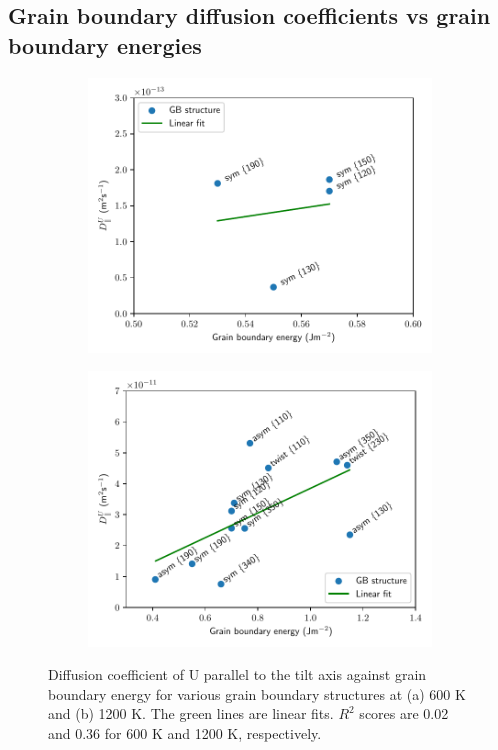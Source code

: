 \documentclass{elsarticle}
\begin{document}
\begin{appendices}
\section{Grain boundary diffusion coefficients vs grain boundary energies}

\begin{figure}[!ht]
    \centering
    \begin{subfigure}{0.49\textwidth}
        \centering
        \caption{}
        \includegraphics[width=\textwidth]{DvsGBE_600K.pdf}
    \end{subfigure}
    \begin{subfigure}{0.49\textwidth}
        \centering
        \caption{}
        \includegraphics[width=\textwidth]{DvsGBE_1200K.pdf}
    \end{subfigure}
\caption{Diffusion coefficient of U parallel to the tilt axis against grain boundary energy for various grain boundary structures at (a) 600 K and (b) 1200 K. The green lines are linear fits. $R^2$ scores are 0.02 and 0.36 for 600 K and 1200 K, respectively.}
\label{fig:DvsGBE}
\end{figure}

\end{appendices}


\FloatBarrier


\end{document}
